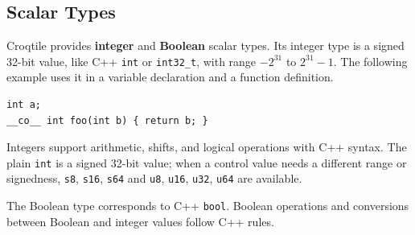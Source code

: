 \subsection*{Scalar Types}

Croqtile provides \textbf{integer} and \textbf{Boolean} scalar types. Its integer type is a signed 32-bit value, like C++ \texttt{int} or \texttt{int32\_t}, with range $-2^{31}$ to $2^{31}-1$. The following example uses it in a variable declaration and a function definition.

\begin{lstlisting}[language=croqtile,caption={Scalar Types (fragment)}]
int a;
__co__ int foo(int b) { return b; }
\end{lstlisting}

Integers support arithmetic, shifts, and logical operations with C++ syntax. The plain \texttt{int} is a signed 32-bit value; when a control value needs a different range or signedness, \texttt{s8}, \texttt{s16}, \texttt{s64} and \texttt{u8}, \texttt{u16}, \texttt{u32}, \texttt{u64} are available.

The Boolean type corresponds to C++ \texttt{bool}. Boolean operations and conversions between Boolean and integer values follow C++ rules.
